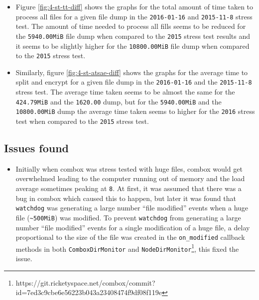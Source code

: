 \begin{itemize}
\item Figure \ref{fig:4-st-tt-diff} shows the graphs for the total
  amount of time taken to process all files for a given file dump in
  the \verb+2016-01-16+ and \verb+2015-11-8+ stress test. The amount
  of time needed to process all fills seems to be reduced for the
  \verb+5940.00MiB+ file dump when compared to the \verb+2015+ stress
  test results and it seems to be slightly higher for the
  \verb+10800.00MiB+ file dump when compared to the \verb+2015+ stress
  test.
\item Similarly, figure \ref{fig:4-st-atsae-diff} shows the graphs for
  the average time to split and encrypt for a given file dump in the
  \verb+2016-01-16+ and the \verb+2015-11-8+ stress test. The average
  time taken seems to be almost the same for the \verb+424.79MiB+ and
  the \verb+1620.00+ dump, but for the \verb+5940.00MiB+ and the
  \verb+10800.00MiB+ dump the average time taken seems to higher for
  the \verb+2016+ stress test when compared to the \verb+2015+ stress
  test.
\end{itemize}

\subsection{Issues found}\label{4-st-if}

\begin{itemize}
\item Initially when combox was stress tested with huge files, combox
  would get overwhelmed leading to the computer running out of memory
  and the load average sometimes peaking at \verb+8+. At first, it was
  assumed that there was a bug in combox which caused this to happen,
  but later it was found that \verb+watchdog+\cite{pylib:watchdog} was
  generating a large number ``file modified'' events when a huge file
  (\verb+~500MiB+) was modified. To prevent \verb+watchdog+ from
  generating a large number ``file modified'' events for a single
  modification of a huge file, a delay proportional to the size of the
  file was created in the \verb+on_modified+ callback methods in both
  \verb+ComboxDirMonitor+ and
  \verb+NodeDirMonitor+\footnote{https://git.ricketyspace.net/combox/commit?id=7ed3c9cbe6e56223b043a23408474f9df08f119e},
  this fixed the issue.
\end{itemize}
